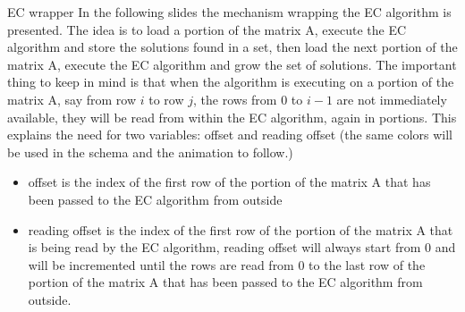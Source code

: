 \documentclass{beamer}
\begin{document}
\begin{frame}{EC wrapper}
    In the following slides the mechanism wrapping the EC algorithm
    is presented. 
    The idea is to load a portion of the matrix A, execute the EC algorithm
    and store the solutions found in a set, then load the next portion of
    the matrix A, execute the EC algorithm and grow the set of solutions.
    The important thing to keep in mind is that when the algorithm 
    is executing on a portion of the matrix A, say from row $i$ to row $j$,
    the rows from $0$ to $i-1$ are not immediately available, they will
    be read from within the EC algorithm, again in portions.
    This explains the need for two variables:
    \textcolor{offset}{offset} and \textcolor{reading_offset}{reading offset}
    (the same colors will be used in the schema and the animation to follow.)
\end{frame}

\begin{frame}{}
    \begin{itemize}
        \item \textcolor{offset}{offset} is the index of the first row of the portion
            of the matrix A that has been passed to the EC algorithm from outside
        \item \textcolor{reading_offset}{reading offset} is the index of the first row of the portion
            of the matrix A that is being read by the EC algorithm,
            reading offset will always start from 0 and will be incremented until
            the rows are read from 0 to the last row of the portion of the matrix A 
            that has been passed to the EC algorithm from outside.
    \end{itemize}
\end{frame}
\end{document}
